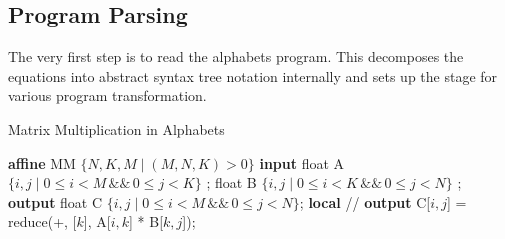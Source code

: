 \subsection{Program Parsing}
The very first step is to read the alphabets program. This decomposes the equations into abstract syntax tree notation internally and sets up the stage for various program transformation.
\begin{algorithm}
\caption{Matrix Multiplication in Alphabets}
\begin{algorithmic} [1]
\STATE \textbf{affine} MM $\lbrace N,K,M \mid (M, N, K)  > 0  \rbrace$
\STATE \textbf{input}
\STATE  \hspace{10pt} float A $\lbrace i, j \mid 0 \leq i < M \hspace{2pt} \&\& \hspace{2pt} 0 \leq j < K   \rbrace$ ;
\STATE  \hspace{10pt} float B $\lbrace i, j \mid 0 \leq i < K \hspace{2pt} \&\& \hspace{2pt} 0 \leq j < N   \rbrace$ ;
\STATE \textbf{output}
\STATE  \hspace{10pt} float C $\lbrace i, j \mid 0 \leq i < M \hspace{2pt} \&\& \hspace{2pt} 0 \leq j < N   \rbrace$;
\STATE \textbf{local}
\STATE \hspace{10pt} \slash \slash {}
\STATE \textbf{output}
\STATE \hspace{10pt} C[$i,j$] = reduce(+, \hspace{2pt} [$k$], \hspace{2pt} A[$i,k$] * B[$k,j$]);
\end{algorithmic}
\label{algo:matrix_mul_alphabets}
\end{algorithm}
